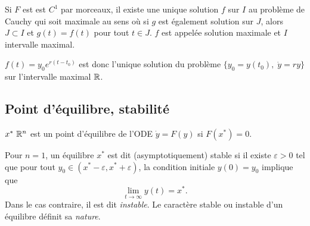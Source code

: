 \begin{theorem}
  Si $F$ est est $C^1$ par morceaux, il existe une unique solution $f$ sur $I$ au problème de Cauchy qui soit maximale au sens où si $g$ est également solution sur $J$, alors $J \subset I$ et $g(t) = f(t)$ pour tout $t \in J$. $f$ est appelée solution maximale et $I$ intervalle maximal.
\end{theorem}

\remark
$f(t) = y_0 e^{r(t-t_0)}$ est donc l'unique solution du problème $\{y_0 = y(t_0), \; \dot y = r y\}$ sur l'intervalle maximal $\mathbb{R}$.


\subsection{Point d'équilibre, stabilité} 

\begin{definition}
  $x^* \ \mathbb{R}^n$ est un point d'équilibre de l'ODE $\dot y = F(y)$ si $F(x^*) = 0$.
\end{definition}

\begin{definition}[Stabilité ($n = 1$)]
  Pour $n = 1$, un équilibre $x^*$ est dit (asymptotiquement) stable si il existe $\varepsilon > 0$ tel que pour tout $y_0 \in (x^* - \varepsilon, x^* + \varepsilon)$, la condition initiale $y(0) = y_0$ implique que 
  $$
  \lim_{t \rightarrow \infty} y(t) = x^*.
  $$
  Dans le cas contraire, il est dit {\em instable}. Le caractère stable ou instable d'un équilibre définit sa {\em nature}.
\end{definition}

